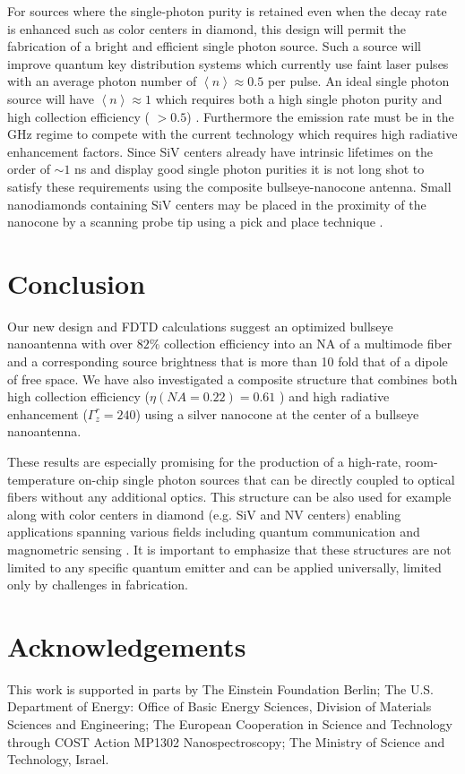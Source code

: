 \documentclass[10pt,onecolumn ]{article}
\begin{document}
For sources where the single-photon purity is retained even when the decay rate is enhanced such as color centers in diamond, this design will permit the fabrication of a bright and efficient single photon source.
Such a source will improve  quantum key distribution systems which currently use faint laser pulses with an average photon number of $\left<n\right>\approx0.5$ per pulse. 
An ideal single photon source will have $\left<n\right>\approx1$ which requires both a high single photon purity and high collection efficiency ( $>0.5$) \cite{Aharonovich2016Solid-stateEmitters}. 
Furthermore the emission rate must be in the GHz regime to compete with the current technology which requires high radiative enhancement factors. 
Since SiV centers already have intrinsic lifetimes on the order of $\sim 1$ ns and display good single photon purities \cite{Li2016NonblinkingNanodiamonds} it is not long shot to satisfy these requirements using the composite bullseye-nanocone antenna.
Small nanodiamonds containing SiV centers may be placed in the proximity of the nanocone by a scanning probe tip using a pick and place technique \cite{Schell2011ADevices}. 

\section{Conclusion}
Our new design and FDTD calculations suggest an optimized bullseye nanoantenna with over $82 \%$ collection efficiency into an NA of a multimode fiber and a corresponding source brightness that is more than 10 fold that of a dipole of free space.
 We have also investigated a composite structure that combines both high collection efficiency ($\eta(NA=0.22)=0.61$ ) and high radiative enhancement ($\Gamma_z^r=240$) using a silver nanocone at the center of a bullseye nanoantenna. 
 
These results are especially promising for the production of a high-rate, room-temperature on-chip single photon sources that can be directly coupled to optical fibers without any additional optics.
This structure can be also used for example along with color centers in diamond (e.g. SiV and NV centers) enabling applications spanning various fields including quantum communication and magnometric sensing \cite{Schroder2016QuantumInvited}.
It is important to emphasize that these structures are not limited to any specific quantum emitter and can be applied universally, limited only by challenges in fabrication. 

\section*{Acknowledgements}
This work is supported in parts by The Einstein Foundation Berlin; The U.S. Department of Energy: Office of Basic Energy Sciences,
Division of Materials Sciences and Engineering; The European Cooperation in Science
and Technology through COST Action MP1302 Nanospectroscopy; The Ministry of Science
and Technology, Israel.
 


\pagebreak

\end{document}
